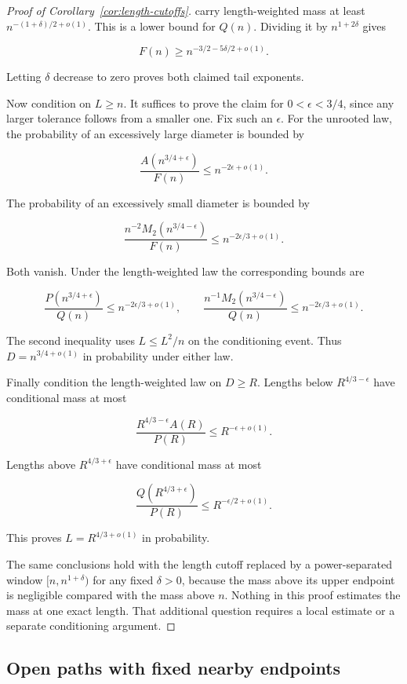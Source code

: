 \begin{proof}[Proof of Corollary~\ref{cor:length-cutoffs}]
carry length-weighted mass at least $n^{-(1+\delta)/2+o(1)}$. This is a lower bound for $Q(n)$. Dividing it by $n^{1+2\delta}$ gives

\[
F(n)\ge n^{-3/2-5\delta/2+o(1)}.
\]

Letting $\delta$ decrease to zero proves both claimed tail exponents.

Now condition on $L\ge n$. It suffices to prove the claim for $0<\epsilon<3/4$, since any larger tolerance follows from a smaller one. Fix such an $\epsilon$. For the unrooted law, the probability of an excessively large diameter is bounded by

\[
\frac{A(n^{3/4+\epsilon})}{F(n)}
       \le n^{-2\epsilon+o(1)}.
\]

The probability of an excessively small diameter is bounded by

\[
\frac{n^{-2}M_2(n^{3/4-\epsilon})}{F(n)}
       \le n^{-2\epsilon/3+o(1)}.
\]

Both vanish. Under the length-weighted law the corresponding bounds are

\[
\frac{P(n^{3/4+\epsilon})}{Q(n)}
       \le n^{-2\epsilon/3+o(1)},\qquad
 \frac{n^{-1}M_2(n^{3/4-\epsilon})}{Q(n)}
       \le n^{-2\epsilon/3+o(1)}.
\]

The second inequality uses $L\le L^2/n$ on the conditioning event. Thus $D=n^{3/4+o(1)}$ in probability under either law.

Finally condition the length-weighted law on $D\ge R$. Lengths below $R^{4/3-\epsilon}$ have conditional mass at most

\[
\frac{R^{4/3-\epsilon}A(R)}{P(R)}
       \le R^{-\epsilon+o(1)}.
\]

Lengths above $R^{4/3+\epsilon}$ have conditional mass at most

\[
\frac{Q(R^{4/3+\epsilon})}{P(R)}
       \le R^{-\epsilon/2+o(1)}.
\]

This proves $L=R^{4/3+o(1)}$ in probability.

The same conclusions hold with the length cutoff replaced by a power-separated window $[n,n^{1+\delta})$ for any fixed $\delta>0$, because the mass above its upper endpoint is negligible compared with the mass above $n$. Nothing in this proof estimates the mass at one exact length. That additional question requires a local estimate or a separate conditioning argument.
\end{proof}

\subsection{Open paths with fixed nearby endpoints}\label{sec:open-cutoffs}

